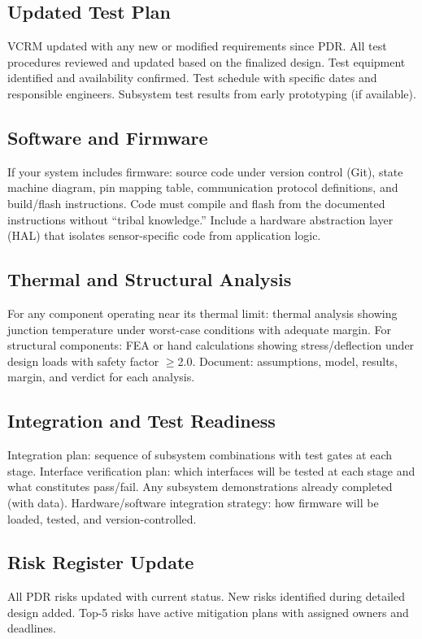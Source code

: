 \documentclass[11pt,letterpaper,twoside,openany]{book}
\begin{document}
\subsection{Updated Test Plan}
VCRM updated with any new or modified requirements since PDR. All test procedures reviewed and updated based on the finalized design. Test equipment identified and availability confirmed. Test schedule with specific dates and responsible engineers. Subsystem test results from early prototyping (if available).



\subsection{Software and Firmware}
If your system includes firmware: source code under version control (Git), state machine diagram, pin mapping table, communication protocol definitions, and build/flash instructions. Code must compile and flash from the documented instructions without ``tribal knowledge.'' Include a hardware abstraction layer (HAL) that isolates sensor-specific code from application logic.

\subsection{Thermal and Structural Analysis}
For any component operating near its thermal limit: thermal analysis showing junction temperature under worst-case conditions with adequate margin. For structural components: FEA or hand calculations showing stress/deflection under design loads with safety factor $\geq$2.0. Document: assumptions, model, results, margin, and verdict for each analysis.

\subsection{Integration and Test Readiness}
Integration plan: sequence of subsystem combinations with test gates at each stage. Interface verification plan: which interfaces will be tested at each stage and what constitutes pass/fail. Any subsystem demonstrations already completed (with data). Hardware/software integration strategy: how firmware will be loaded, tested, and version-controlled.

\subsection{Risk Register Update}
All PDR risks updated with current status. New risks identified during detailed design added. Top-5 risks have active mitigation plans with assigned owners and deadlines.
\end{document}
